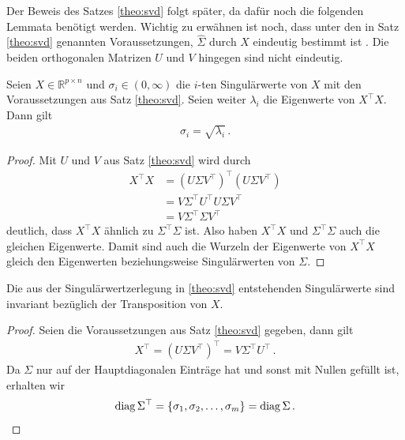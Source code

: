 \documentclass[../Bachelor_LennartKoliwer.tex]{subfiles}
\begin{document}
Der Beweis des Satzes \ref{theo:svd} folgt später, da dafür noch die folgenden Lemmata benötigt werden.
Wichtig zu erwähnen ist noch, dass unter den in Satz \ref{theo:svd} genannten Voraussetzungen, $\hat{\Sigma}$ durch $X$ eindeutig bestimmt ist \cite[229]{Numerik1}.
Die beiden orthogonalen Matrizen $U$ und $V$ hingegen sind nicht eindeutig.

\begin{lemma}\label{lem:EigenwerteSingulärwerte}
	Seien \(X\in \mathbb{R}^{p\times n}\) und $\sigma_i\in(0,\infty)$ die $i$-ten Singulärwerte von $X$ mit den Voraussetzungen aus Satz \ref{theo:svd}. 
	Seien weiter $\lambda_i$ die Eigenwerte von $X^\top X$. 
	Dann gilt 
	\begin{align}
		\sigma_i=\sqrt{\lambda_i}\,.\label{eq:SWzuEW}
	\end{align}
		
\end{lemma}

\begin{proof}
	Mit $U$ und $V$ aus Satz \ref{theo:svd} wird durch 
	\begin{align*}
		X^\top X &= \left(U\Sigma V^\top\right)^\top\left(U\Sigma V^\top\right)\\
				 &= V\Sigma^\top U^\top U\Sigma V^\top \\
				 &= V\Sigma^\top \Sigma V^\top
	\end{align*}
	deutlich, dass $X^\top X$ ähnlich zu $\Sigma^\top \Sigma$ ist. 
	Also haben $X^\top X$ und $\Sigma^\top \Sigma$ auch die gleichen Eigenwerte.
	Damit sind auch die Wurzeln der Eigenwerte von $X^\top X$ gleich den Eigenwerten beziehungsweise Singulärwerten von $\Sigma$.
\end{proof}

\begin{lemma} \label{lem:InvarinatBzglTansp}
	Die aus der Singulärwertzerlegung in \ref{theo:svd} entstehenden Singulärwerte sind invariant bezüglich der Transposition von $X$.
\end{lemma}

\begin{proof}
	Seien die Voraussetzungen aus Satz \ref{theo:svd} gegeben, dann gilt
	\begin{align*}
		X^\top = \left(U\Sigma V^\top\right)^\top = V\Sigma^\top U^\top\,.
	\end{align*}
	Da $\Sigma$ nur auf der Hauptdiagonalen Einträge hat und sonst mit Nullen gefüllt ist, erhalten wir
	\[
		\operatorname{diag} \Sigma^\top = \{\sigma_1,\sigma_2,\dots,\sigma_m\} =\operatorname{diag} \Sigma\,.
	\]
\end{proof}
\end{document}
